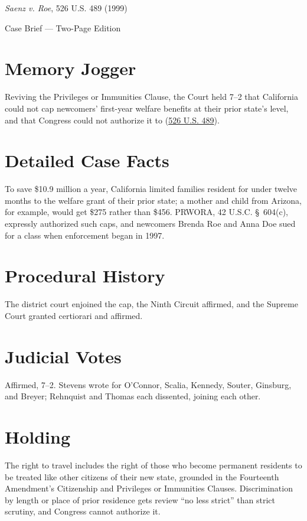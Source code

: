 \documentclass[12pt]{article}
\begin{document}
\begin{center}
{\LARGE \textit{Saenz v. Roe}, 526 U.S. 489 (1999)\par}
\vspace{0.5em}
{\large Case Brief --- Two-Page Edition\par}
\end{center}

\section{Memory Jogger}
Reviving the Privileges or Immunities Clause, the Court held 7--2 that California could not cap newcomers' first-year welfare benefits at their prior state's level, and that Congress could not authorize it to (\href{https://www.law.cornell.edu/supremecourt/text/98-97}{526 U.S. 489}).

\section{Detailed Case Facts}
To save \$10.9 million a year, California limited families resident for under twelve months to the welfare grant of their prior state; a mother and child from Arizona, for example, would get \$275 rather than \$456. PRWORA, 42 U.S.C. \S~604(c), expressly authorized such caps, and newcomers Brenda Roe and Anna Doe sued for a class when enforcement began in 1997.

\section{Procedural History}
The district court enjoined the cap, the Ninth Circuit affirmed, and the Supreme Court granted certiorari and affirmed.

\section{Judicial Votes}
Affirmed, 7--2. Stevens wrote for O'Connor, Scalia, Kennedy, Souter, Ginsburg, and Breyer; Rehnquist and Thomas each dissented, joining each other.

\section{Holding}
The right to travel includes the right of those who become permanent residents to be treated like other citizens of their new state, grounded in the Fourteenth Amendment's Citizenship and Privileges or Immunities Clauses. Discrimination by length or place of prior residence gets review ``no less strict'' than strict scrutiny, and Congress cannot authorize it.
\end{document}
